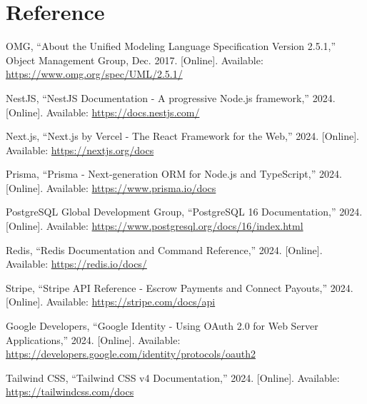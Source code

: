 \newpage
\section{Reference}
\label{sec:reference}

\begin{enumerate}[label={[\arabic*]},leftmargin=2.5em,itemsep=6pt]
    \item OMG, ``About the Unified Modeling Language Specification Version 2.5.1,'' Object Management Group, Dec. 2017. [Online]. Available: \url{https://www.omg.org/spec/UML/2.5.1/}
    \item NestJS, ``NestJS Documentation - A progressive Node.js framework,'' 2024. [Online]. Available: \url{https://docs.nestjs.com/}
    \item Next.js, ``Next.js by Vercel - The React Framework for the Web,'' 2024. [Online]. Available: \url{https://nextjs.org/docs}
    \item Prisma, ``Prisma - Next-generation ORM for Node.js and TypeScript,'' 2024. [Online]. Available: \url{https://www.prisma.io/docs}
    \item PostgreSQL Global Development Group, ``PostgreSQL 16 Documentation,'' 2024. [Online]. Available: \url{https://www.postgresql.org/docs/16/index.html}
    \item Redis, ``Redis Documentation and Command Reference,'' 2024. [Online]. Available: \url{https://redis.io/docs/}
    \item Stripe, ``Stripe API Reference - Escrow Payments and Connect Payouts,'' 2024. [Online]. Available: \url{https://stripe.com/docs/api}
    \item Google Developers, ``Google Identity - Using OAuth 2.0 for Web Server Applications,'' 2024. [Online]. Available: \url{https://developers.google.com/identity/protocols/oauth2}
    \item Tailwind CSS, ``Tailwind CSS v4 Documentation,'' 2024. [Online]. Available: \url{https://tailwindcss.com/docs}
\end{enumerate}

